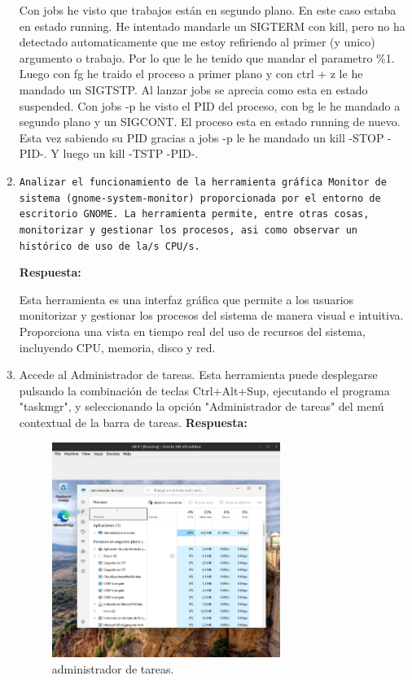 \documentclass[a4paper,12pt]{article}
\begin{document}
\begin{enumerate}[label=\textbf{Pregunta \arabic*.}]
    Con jobs he visto que trabajos están en segundo plano.
    En este caso estaba en estado running. He intentado mandarle un SIGTERM con kill, pero no ha detectado automaticamente que me estoy refiriendo al primer (y unico) argumento o trabajo. Por lo que le he tenido que mandar el parametro \%1.
    Luego con fg he traido el proceso a primer plano y con ctrl + z le he mandado un SIGTSTP. Al lanzar jobs se aprecia como esta en estado suspended. Con jobs -p he visto el PID del proceso, con bg le he mandado a segundo plano y un SIGCONT. El proceso esta en estado running de nuevo. Esta vez sabiendo su PID gracias a jobs -p le he mandado un kill -STOP -PID-. Y luego un kill -TSTP -PID-.


    \item \texttt{Analizar el funcionamiento de la herramienta gráfica Monitor de sistema (gnome-system-monitor) proporcionada por el entorno de escritorio GNOME. La herramienta permite, entre otras cosas, monitorizar y gestionar los procesos, asi como observar un histórico de uso de la/s CPU/s.}
    
    \textbf{Respuesta:}

    Esta herramienta es una interfaz gráfica que permite a los usuarios monitorizar y gestionar los procesos del sistema de manera visual e intuitiva. Proporciona una vista en tiempo real del uso de recursos del sistema, incluyendo CPU, memoria, disco y red.




    \item Accede al Administrador de tareas. Esta herramienta puede desplegarse pulsando la combinación de teclas Ctrl+Alt+Sup, ejecutando el programa "taskmgr", y seleccionando la opción "Administrador de tareas" del menú contextual de la barra de tareas.
    \textbf{Respuesta:}
    \begin{figure}[h!]
        \centering
        \includegraphics[width=0.7\textwidth]{6.png}
        \caption{administrador de tareas.}
    \end{figure}



\end{enumerate}
\end{document}
